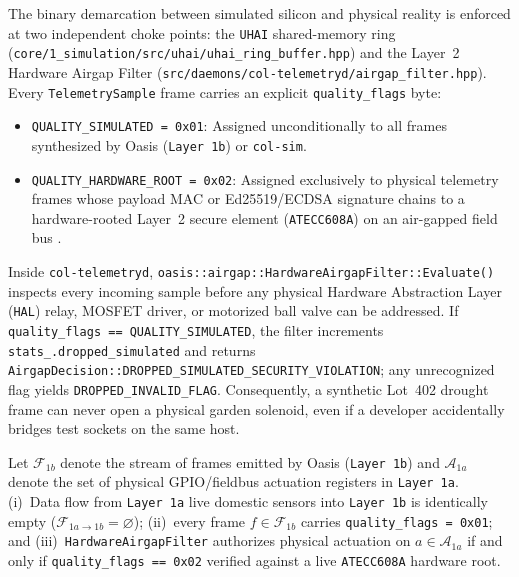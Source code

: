 The binary demarcation between simulated silicon and physical reality is enforced at two independent choke points: the \texttt{UHAI} shared-memory ring (\texttt{core/1\_simulation/src/uhai/uhai\_ring\_buffer.hpp}) and the Layer~2 Hardware Airgap Filter (\texttt{src/daemons/col-telemetryd/airgap\_filter.hpp}). Every \texttt{TelemetrySample} frame carries an explicit \texttt{quality\_flags} byte:
\begin{itemize}
  \item \texttt{QUALITY\_SIMULATED = 0x01}: Assigned unconditionally to all frames synthesized by Oasis (\texttt{Layer 1b}) or \texttt{col-sim}.
  \item \texttt{QUALITY\_HARDWARE\_ROOT = 0x02}: Assigned exclusively to physical telemetry frames whose payload MAC or Ed25519/ECDSA signature chains to a hardware-rooted Layer~2 secure element (\texttt{ATECC608A}) on an air-gapped field bus \parencite{microchip_atecc608a,rose2020zero}.
\end{itemize}

Inside \texttt{col-telemetryd}, \texttt{oasis::airgap::HardwareAirgapFilter::Evaluate()} inspects every incoming sample before any physical Hardware Abstraction Layer (\texttt{HAL}) relay, MOSFET driver, or motorized ball valve can be addressed. If \texttt{quality\_flags == QUALITY\_SIMULATED}, the filter increments \texttt{stats\_.dropped\_simulated} and returns \texttt{AirgapDecision::DROPPED\_SIMULATED\_SECURITY\_VIOLATION}; any unrecognized flag yields \texttt{DROPPED\_INVALID\_FLAG}. Consequently, a synthetic Lot~402 drought frame can never open a physical garden solenoid, even if a developer accidentally bridges test sockets on the same host.

\begin{invariant}
\label{inv:sitl-airgap}
Let $\mathcal{F}_{1b}$ denote the stream of frames emitted by Oasis (\texttt{Layer 1b}) and $\mathcal{A}_{1a}$ denote the set of physical GPIO/fieldbus actuation registers in \texttt{Layer 1a}. (i)~Data flow from \texttt{Layer 1a} live domestic sensors into \texttt{Layer 1b} is identically empty ($\mathcal{F}_{1a \to 1b} = \varnothing$); (ii)~every frame $f \in \mathcal{F}_{1b}$ carries \texttt{quality\_flags = 0x01}; and (iii)~\texttt{HardwareAirgapFilter} authorizes physical actuation on $a \in \mathcal{A}_{1a}$ if and only if \texttt{quality\_flags == 0x02} verified against a live \texttt{ATECC608A} hardware root.
\end{invariant}

